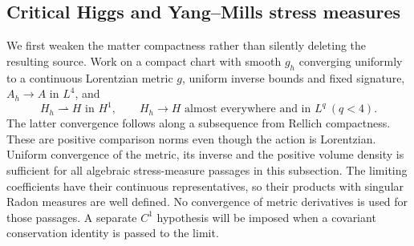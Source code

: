 \documentclass[11pt]{article}
\numberwithin{equation}{section}
\theoremstyle{definition}
\theoremstyle{remark}
\begin{document}
\subsection{Critical Higgs and Yang--Mills stress measures}

We first weaken the matter compactness rather than silently deleting the resulting source. Work on a compact chart with smooth $g_h$ converging uniformly to a continuous Lorentzian metric $g$, uniform inverse bounds and fixed signature, $A_h\to A$ in $L^4$, and
\begin{equation}
 H_h\rightharpoonup H\text{ in }H^1,
 \qquad H_h\to H\text{ almost everywhere and in }L^q\ (q<4).
 \label{eq:critical-Higgs}
\end{equation}
The latter convergence follows along a subsequence from Rellich compactness. These are positive comparison norms even though the action is Lorentzian.
Uniform convergence of the metric, its inverse and the positive volume density
is sufficient for all algebraic stress-measure passages in this subsection.
The limiting coefficients have their continuous representatives, so their
products with singular Radon measures are well defined. No convergence of
metric derivatives is used for those passages. A separate $C^1$ hypothesis
will be imposed when a covariant conservation identity is passed to the limit.
\end{document}
